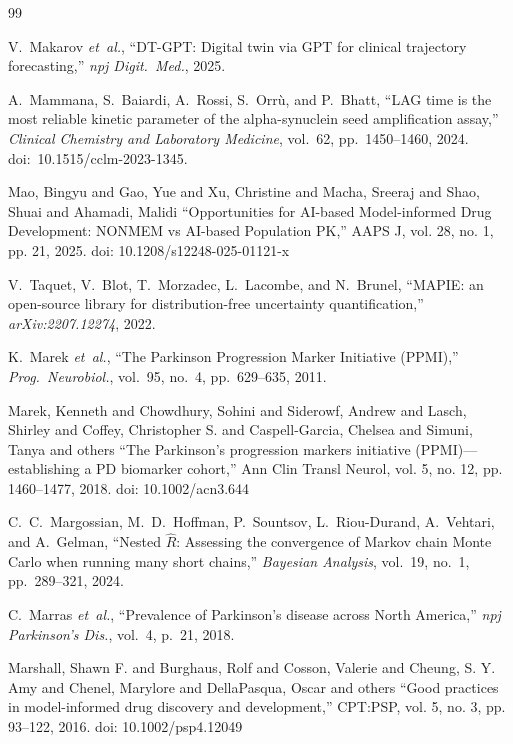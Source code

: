 \begin{thebibliography}{99}

V.~Makarov \textit{et~al.}, ``DT-GPT: Digital twin via GPT for clinical trajectory forecasting,'' \textit{npj Digit.\ Med.}, 2025.

A.~Mammana, S.~Baiardi, A.~Rossi, S.~Orrù, and P.~Bhatt, ``LAG time is the most reliable kinetic parameter of the alpha-synuclein seed amplification assay,'' \textit{Clinical Chemistry and Laboratory Medicine}, vol.~62, pp.~1450--1460, 2024. doi:~10.1515/cclm-2023-1345.

 Mao, Bingyu and Gao, Yue and Xu, Christine and Macha, Sreeraj and Shao, Shuai and Ahamadi, Malidi ``Opportunities for AI-based Model-informed Drug Development: NONMEM vs AI-based Population PK,'' AAPS J, vol. 28, no. 1, pp. 21, 2025. doi: 10.1208/s12248-025-01121-x

V.~Taquet, V.~Blot, T.~Morzadec, L.~Lacombe, and N.~Brunel, ``MAPIE: an open-source library for distribution-free uncertainty quantification,'' \textit{arXiv:2207.12274}, 2022.

K.~Marek \textit{et~al.}, ``The Parkinson Progression Marker Initiative (PPMI),'' \textit{Prog.\ Neurobiol.}, vol.~95, no.~4, pp.~629--635, 2011.

 Marek, Kenneth and Chowdhury, Sohini and Siderowf, Andrew and Lasch, Shirley and Coffey, Christopher S. and Caspell-Garcia, Chelsea and Simuni, Tanya and others ``The Parkinson's progression markers initiative (PPMI)---establishing a PD biomarker cohort,'' Ann Clin Transl Neurol, vol. 5, no. 12, pp. 1460--1477, 2018. doi: 10.1002/acn3.644

C.~C.~Margossian, M.~D.~Hoffman, P.~Sountsov, L.~Riou-Durand, A.~Vehtari, and A.~Gelman, ``Nested $\widehat{R}$: Assessing the convergence of Markov chain Monte Carlo when running many short chains,'' \textit{Bayesian Analysis}, vol.~19, no.~1, pp.~289--321, 2024.

C.~Marras \textit{et~al.}, ``Prevalence of Parkinson's disease across North America,'' \textit{npj Parkinson's Dis.}, vol.~4, p.~21, 2018.

 Marshall, Shawn F. and Burghaus, Rolf and Cosson, Valerie and Cheung, S. Y. Amy and Chenel, Marylore and DellaPasqua, Oscar and others ``Good practices in model-informed drug discovery and development,'' CPT:PSP, vol. 5, no. 3, pp. 93--122, 2016. doi: 10.1002/psp4.12049


\end{thebibliography}
